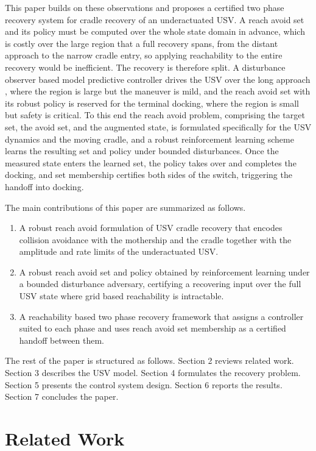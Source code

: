 \documentclass[5p,times,authoryear]{elsarticle}
\begin{document}
This paper builds on these observations and proposes a certified two phase recovery system for cradle recovery of an underactuated USV. A reach avoid set and its policy must be computed over the whole state domain in advance, which is costly over the large region that a full recovery spans, from the distant approach to the narrow cradle entry, so applying reachability to the entire recovery would be inefficient. The recovery is therefore split. A disturbance observer based model predictive controller drives the USV over the long approach \citep{park2026recovery}, where the region is large but the maneuver is mild, and the reach avoid set with its robust policy is reserved for the terminal docking, where the region is small but safety is critical. To this end the reach avoid problem, comprising the target set, the avoid set, and the augmented state, is formulated specifically for the USV dynamics and the moving cradle, and a robust reinforcement learning scheme learns the resulting set and policy under bounded disturbances. Once the measured state enters the learned set, the policy takes over and completes the docking, and set membership certifies both sides of the switch, triggering the handoff into docking.

The main contributions of this paper are summarized as follows.
\begin{enumerate}\itemsep=0pt
\item A robust reach avoid formulation of USV cradle recovery that encodes collision avoidance with the mothership and the cradle together with the amplitude and rate limits of the underactuated USV.
\item A robust reach avoid set and policy obtained by reinforcement learning under a bounded disturbance adversary, certifying a recovering input over the full USV state where grid based reachability is intractable.
\item A reachability based two phase recovery framework that assigns a controller suited to each phase and uses reach avoid set membership as a certified handoff between them.
\end{enumerate}
The rest of the paper is structured as follows. Section 2 reviews related work. Section 3 describes the USV model. Section 4 formulates the recovery problem. Section 5 presents the control system design. Section 6 reports the results. Section 7 concludes the paper.

\section{Related Work}\label{sec_related}
\end{document}
